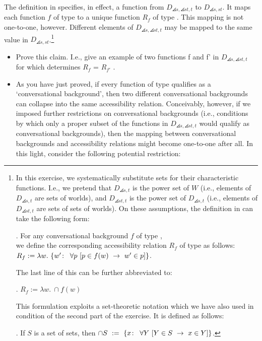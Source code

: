 \begin{exercise}\label{closure}
	
	The definition in \Last specifies, in effect, a function from
  $D_{\angles{s,\angles{st,t}}}$ to $D_{\angles{s,st}}$. It maps each
  function $f$ of type  to a unique function
  $R_{f}$ of type . This mapping is not one-to-one,
  however. Different elements of $D_{\angles{s,\angles{st,t}}}$ may be
  mapped to the same value in $D_{\angles{s,st}}$.\footnote{In this
    exercise, we systematically substitute sets for their
    characteristic functions. I.e., we pretend that $D_{\angles{s,t}}$
    is the power set of $W$ (i.e., elements of $D_{\angles{s,t}}$ are
    sets of worlds), and $D_{\angles{st,t}}$ is the power set of
    $D_{\angles{s,t}}$ (i.e., elements of $D_{\angles{st,t}}$ are sets
    of sets of worlds). On these assumptions, the definition in \Last
    can take the following form:
	
	\ex. For any conversational background $f$ of type , \\
	we define the corresponding accessibility relation $R_{f}$ of type  as follows:\\
	$R_{f} := \lambda w.\ \{w'\co\ \forall p\ [p\in f(w)\ \rightarrow\ w'\in p] \}$.
	
	The last line of this can be further abbreviated to:
	
	\ex. $R_{f} := \lambda w.\ \ensuremath{\cap}f(w)$
	
	This formulation exploits a set-theoretic notation which we have
  also used in condition \TextNext of the second part of the exercise.
  It is defined as follows:
	
	\ex. If $S$ is a set of sets, then $\ensuremath{\cap}S\ :=\ \{x\co\ \forall Y\ [Y\in S\ \rightarrow\ x\in Y]\}$.
	
}

	\begin{itemize}
		
  \item Prove this claim. I.e., give an example of two functions f and
    f' in $D_{\angles{s,\angles{st,t}}}$ for which \Last determines
    $R_{f}$ = $R_{f'}$ .
		
  \item As you have just proved, if every function of type
     qualifies as a `conversational
    background', then two different conversational backgrounds can
    collapse into the same accessibility relation. Conceivably,
    however, if we imposed further restrictions on conversational
    backgrounds (i.e., conditions by which only a proper subset of the
    functions in $D_{\angles{s,\angles{st,t}}}$ would qualify as
    conversational backgrounds), then the mapping between
    conversational backgrounds and accessibility relations might
    become one-to-one after all. In this light, consider the following
    potential restriction:
		

\end{itemize}
\end{exercise}
